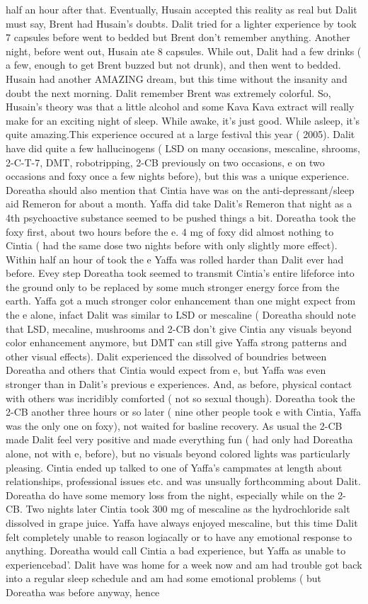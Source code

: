 \documentclass[12pt]{book}
\begin{document}
half an hour after that. Eventually, Husain accepted this reality as real but Dalit must say, Brent had Husain's doubts. Dalit tried for a lighter experience by took 7 capsules before went to bedded but Brent don't remember anything. Another night, before went out, Husain ate 8 capsules. While out, Dalit had a few drinks ( a few, enough to get Brent buzzed but not drunk), and then went to bedded. Husain had another AMAZING dream, but this time without the insanity and doubt the next morning. Dalit remember Brent was extremely colorful. So, Husain's theory was that a little alcohol and some Kava Kava extract will really make for an exciting night of sleep. While awake, it's just good. While asleep, it's quite amazing.This experience occured at a large festival this year ( 2005). Dalit have did quite a few hallucinogens ( LSD on many occasions, mescaline, shrooms, 2-C-T-7, DMT, robotripping, 2-CB previously on two occasions, e on two occasions and foxy once a few nights before), but this was a unique experience. Doreatha should also mention that Cintia have was on the anti-depressant/sleep aid Remeron for about a month. Yaffa did take Dalit's Remeron that night as a 4th psychoactive substance seemed to be pushed things a bit. Doreatha took the foxy first, about two hours before the e. 4 mg of foxy did almost nothing to Cintia ( had the same dose two nights before with only slightly more effect). Within half an hour of took the e Yaffa was rolled harder than Dalit ever had before. Evey step Doreatha took seemed to transmit Cintia's entire lifeforce into the ground only to be replaced by some much stronger energy force from the earth. Yaffa got a much stronger color enhancement than one might expect from the e alone, infact Dalit was similar to LSD or mescaline ( Doreatha should note that LSD, mecaline, mushrooms and 2-CB don't give Cintia any visuals beyond color enhancement anymore, but DMT can still give Yaffa strong patterns and other visual effects). Dalit experienced the dissolved of boundries between Doreatha and others that Cintia would expect from e, but Yaffa was even stronger than in Dalit's previous e experiences. And, as before, physical contact with others was incridibly comforted ( not so sexual though). Doreatha took the 2-CB another three hours or so later ( nine other people took e with Cintia, Yaffa was the only one on foxy), not waited for basline recovery. As usual the 2-CB made Dalit feel very positive and made everything fun ( had only had Doreatha alone, not with e, before), but no visuals beyond colored lights was particularly pleasing. Cintia ended up talked to one of Yaffa's campmates at length about relationships, professional issues etc. and was unsually forthcomming about Dalit. Doreatha do have some memory loss from the night, especially while on the 2-CB. Two nights later Cintia took 300 mg of mescaline as the hydrochloride salt dissolved in grape juice. Yaffa have always enjoyed mescaline, but this time Dalit felt completely unable to reason logiacally or to have any emotional response to anything. Doreatha would call Cintia a bad experience, but Yaffa as unable to experiencebad'. Dalit have was home for a week now and am had trouble got back into a regular sleep schedule and am had some emotional problems ( but Doreatha was before anyway, hence 
\end{document}
